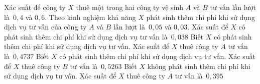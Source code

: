 \begin{ex}%
	Xác suất để công ty $X$ thuê một trong hai công ty vệ sinh $A$ và $B$ tư vấn lần lượt là~$0{,}4$ và $0{,}6$. Theo kinh nghiệm khả năng $X$ phát sinh thêm chi phí khi  sử dụng dịch vụ tư vấn của công ty $A$ và $B$ lần lượt là~$0{,}05$ và $0{,}03$.
	 \choiceTF
		{\True Xác suất để $X$ có phát sinh thêm chi phí khi sử dụng dịch vụ tư  vấn là~$0{,}038$}
		{Biết $X$ có phát sinh thêm chi  phí khi sử dụng dịch vụ tư vấn. Xác suất để $X$ thuê công ty $A$ tư vấn là~$0{,}4737$}
		{Biết $X$ có phát sinh thêm chi phí khi sử dụng dịch vụ tư vấn. Xác suất để $X$ thuê công ty  $B$ tư vấn là~$0{,}5263$}
		{\True Biết $X$  không phát sinh thêm chi phí khi sử dụng dịch vụ tư vấn. Xác suất để $X$ thuê công ty $A$ tư vấn là~$0{,}395$}
\end{ex}


